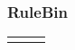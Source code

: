\documentclass[a0,portrait]{a0poster}
\begin{document}
\begin{multicols}{2}
\subsubsection*{RuleBin}

\begin{tabularx}{\linewidth}{CCC}
&
\end{tabularx}



\end{multicols}
\end{document}
